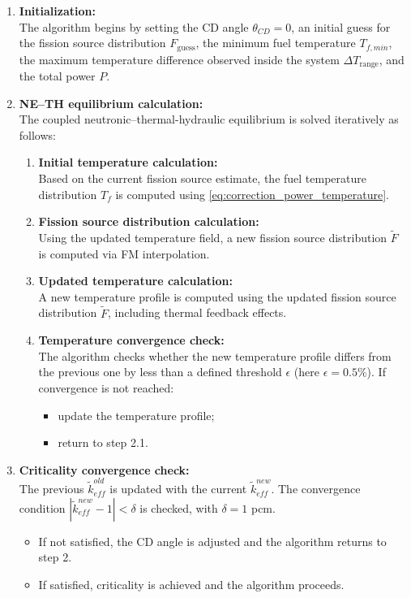 \documentclass[preprint,review,12pt]{elsarticle}
\begin{document}
\begin{enumerate}
    \item \textbf{Initialization:} \\
    The algorithm begins by setting the CD angle $\theta_{CD} = 0$, an initial guess for the fission source distribution $F_{\text{guess}}$, the minimum fuel temperature $T_{f,min}$, the maximum temperature difference observed inside the system $\Delta T_{\text{range}}$, and the total power $P$.

    \item \textbf{NE--TH equilibrium calculation:} \\
    The coupled neutronic–thermal-hydraulic equilibrium is solved iteratively as follows:

    \begin{enumerate}
        \item \textbf{Initial temperature calculation:} \\
        Based on the current fission source estimate, the fuel temperature distribution $T_f$ is computed using \cref{eq:correction_power_temperature}.

        \item \textbf{Fission source distribution calculation:} \\
        Using the updated temperature field, a new fission source distribution $\tilde{F}$ is computed via FM interpolation.

        \item \textbf{Updated temperature calculation:} \\
        A new temperature profile is computed using the updated fission source distribution $\tilde{F}$, including thermal feedback effects.

        \item \textbf{Temperature convergence check:} \\
        The algorithm checks whether the new temperature profile differs from the previous one by less than a defined threshold $\epsilon$ (here $\epsilon = 0.5\%$). If convergence is not reached:
        \begin{itemize}
            \item update the temperature profile;
            \item return to step 2.1.
        \end{itemize}
    \end{enumerate}

    \item \textbf{Criticality convergence check:} \\
    The previous $\tilde{k}_{eff}^{old}$ is updated with the current $\tilde{k}_{eff}^{new}$. The convergence condition
    $|\tilde{k}_{eff}^{new} - 1| < \delta$ is checked, with $\delta = 1$ pcm.
    \begin{itemize}
        \item If not satisfied, the CD angle is adjusted and the algorithm returns to step 2.
        \item If satisfied, criticality is achieved and the algorithm proceeds.
    \end{itemize}


\end{enumerate}
\end{document}
